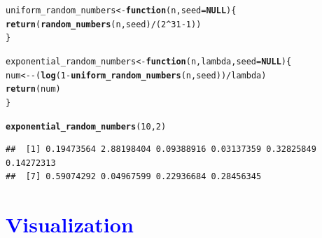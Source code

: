\documentclass[11pt, a4paper]{article}\usepackage[]{graphicx}\usepackage[]{xcolor}
\makeatletter
\newcommand{\hlnum}[1]{\textcolor[rgb]{0.686,0.059,0.569}{#1}}%
\newcommand{\hlopt}[1]{\textcolor[rgb]{0,0,0}{#1}}%
\newcommand{\hldef}[1]{\textcolor[rgb]{0.345,0.345,0.345}{#1}}%
\newcommand{\hlkwa}[1]{\textcolor[rgb]{0.161,0.373,0.58}{\textbf{#1}}}%
\newcommand{\hlkwb}[1]{\textcolor[rgb]{0.69,0.353,0.396}{#1}}%
\newcommand{\hlkwc}[1]{\textcolor[rgb]{0.333,0.667,0.333}{#1}}%
\newcommand{\hlkwd}[1]{\textcolor[rgb]{0.737,0.353,0.396}{\textbf{#1}}}%
\newenvironment{kframe}{%
 \def\at@end@of@kframe{}%
 \ifinner\ifhmode%
  \def\at@end@of@kframe{\end{minipage}}%
  \begin{minipage}{\columnwidth}%
 \fi\fi%
 \def\FrameCommand##1{\hskip\@totalleftmargin \hskip-\fboxsep
 \colorbox{shadecolor}{##1}\hskip-\fboxsep
     \hskip-\linewidth \hskip-\@totalleftmargin \hskip\columnwidth}%
 \MakeFramed {\advance\hsize-\width
   \@totalleftmargin\z@ \linewidth\hsize
   \@setminipage}}%
 {\par\unskip\endMakeFramed%
 \at@end@of@kframe}
\newenvironment{knitrout}{}{} %
\makeatother
\begin{document}
\begin{knitrout}
\color{fgcolor}\begin{kframe}
\begin{alltt}
\hldef{uniform_random_numbers} \hlkwb{<-} \hlkwa{function}\hldef{(}\hlkwc{n}\hldef{,} \hlkwc{seed} \hldef{=} \hlkwa{NULL}\hldef{)\{}
  \hlkwd{return}\hldef{(}\hlkwd{random_numbers}\hldef{(n, seed)} \hlopt{/} \hldef{(}\hlnum{2}\hlopt{^}\hlnum{31} \hlopt{-} \hlnum{1}\hldef{))}
\hldef{\}}
\end{alltt}
\end{kframe}
\end{knitrout}

\begin{knitrout}
\color{fgcolor}\begin{kframe}
\begin{alltt}
\hldef{exponential_random_numbers} \hlkwb{<-} \hlkwa{function}\hldef{(}\hlkwc{n}\hldef{,} \hlkwc{lambda}\hldef{,} \hlkwc{seed} \hldef{=} \hlkwa{NULL}\hldef{)\{}
  \hldef{num} \hlkwb{<-} \hlopt{-}\hldef{(}\hlkwd{log}\hldef{(}\hlnum{1} \hlopt{-} \hlkwd{uniform_random_numbers}\hldef{(n, seed))} \hlopt{/} \hldef{lambda)}
  \hlkwd{return}\hldef{(num)}
\hldef{\}}
\end{alltt}
\end{kframe}
\end{knitrout}

\begin{knitrout}
\color{fgcolor}\begin{kframe}
\begin{alltt}
\hlkwd{exponential_random_numbers}\hldef{(}\hlnum{10}\hldef{,} \hlnum{2}\hldef{)}
\end{alltt}
\begin{verbatim}
##  [1] 0.19473564 2.88198404 0.09388916 0.03137359 0.32825849 0.14272313
##  [7] 0.59074292 0.04967599 0.22936684 0.28456345
\end{verbatim}
\end{kframe}
\end{knitrout}

\newpage

\section*{\faArrowAltCircleRight[regular] \textcolor{blue}{Visualization}}
\end{document}
